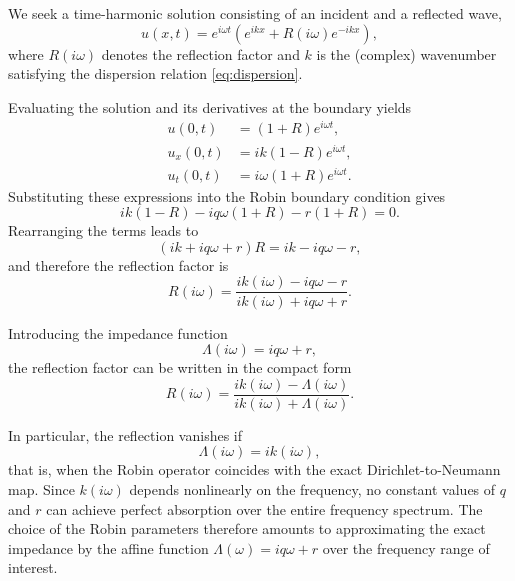 \documentclass{Configuration_Files/PoliMi3i_thesis}
\begin{document}
We seek a time-harmonic solution consisting of an incident and a reflected wave,
\begin{equation*}
u(x,t)
=
e^{i\omega t}
\left(
e^{ikx}
+
R(i\omega)e^{-ikx}
\right),
\end{equation*}
where \(R(i\omega)\) denotes the reflection factor and \(k\) is the (complex) wavenumber satisfying the dispersion relation \eqref{eq:dispersion}.

Evaluating the solution and its derivatives at the boundary yields
\begin{align*}
u(0,t)
&=
(1+R)e^{i\omega t},
\\
u_x(0,t)
&=
ik(1-R)e^{i\omega t},
\\
u_t(0,t)
&=
i\omega(1+R)e^{i\omega t}.
\end{align*}
Substituting these expressions into the Robin boundary condition gives
\begin{equation*}
ik(1-R)
-iq\omega(1+R)
-r(1+R)
=
0.
\end{equation*}
Rearranging the terms leads to
\begin{equation*}
(ik+iq\omega+r)R
=
ik-iq\omega-r,
\end{equation*}
and therefore the reflection factor is
\begin{equation}
R(i\omega)
=
\frac{
ik(i\omega)-iq\omega-r
}
{
ik(i\omega)+iq\omega+r
}.
\label{eq:reflection_cont}
\end{equation}

Introducing the impedance function
\begin{equation*}
\Lambda(i\omega)
=
iq\omega+r,
\end{equation*}
the reflection factor can be written in the compact form
\begin{equation*}
R(i\omega)
=
\frac{
ik(i\omega)-\Lambda(i\omega)
}
{
ik(i\omega)+\Lambda(i\omega)
}.
\end{equation*}

In particular, the reflection vanishes if
\begin{equation*}
\Lambda(i\omega)=ik(i\omega),
\end{equation*}
that is, when the Robin operator coincides with the exact Dirichlet-to-Neumann map. Since \(k(i\omega)\) depends nonlinearly on the frequency, no constant values of \(q\) and \(r\) can achieve perfect absorption over the entire frequency
spectrum. The choice of the Robin parameters therefore amounts to approximating the exact impedance by the affine function \(\Lambda(\omega)=iq\omega+r\) over the frequency range of interest.
\end{document}
